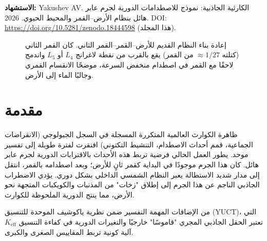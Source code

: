 \documentclass[11pt,a4paper]{article}
\begin{document}
	\vspace{0.1cm}
	\noindent
	{\color{darkblue}\textbf{الاستشهاد:}} Yakushev AV. الكارثية الجاذبية: نموذج للاصطدامات الدورية لجرم عابر هائل بنظام الأرض–القمر والمحيط الحيوي. 2026. DOI: \url{https://doi.org/10.5281/zenodo.18444598} (هذا المجلد).
	
	\vspace{0.4cm}
	
	\begin{figure}[htbp]
		\centering
		\caption{إعادة بناء النظام القديم للأرض–القمر–القمر الثاني. كان القمر الثاني (كتلته \(\approx 1/27\) من القمر) يقع بالقرب من نقطة لاغرانج \(L_4\) أو \(L_5\) واندمج لاحقًا مع القمر في اصطدام منخفض السرعة، موضحًا الانقسام القمري وجالبًا الماء إلى الأرض.}
		\label{fig:two-moons}
	\end{figure}
	
	\section{مقدمة}
	
	ظاهرة الكوارث العالمية المتكررة المسجلة في السجل الجيولوجي (الانقراضات الجماعية، قمم أحداث الاصطدام، التنشيط التكتوني) افتقرت لفترة طويلة إلى تفسير موحد. يطور العمل الحالي فرضية تربط هذه الأحداث بالاقترابات الدورية لجرم عابر هائل. كان هذا الجرم موجودًا في البداية كقمر ثانٍ للأرض؛ وبعد اصطدامه بالقمر، انتقل إلى مدار شديد الاستطالة يعبر النظام الشمسي الداخلي بشكل دوري. يؤدي الاضطراب الجاذبي الناجم عن هذا الجرم إلى إطلاق "زخات" من المذنبات والكويكبات المتجهة نحو الأرض، مما ينتج الدورية الملحوظة للكوارث.
	
	من الإضافات المهمة التفسير ضمن نظرية ياكوشيف الموحدة للتنسيق (YUCT)، التي تعتبر الحقل الجاذبي المجري "قاموسًا" خارجيًا والتغيرات الدورية في كفاءة التنسيق \(K_{\mathrm{eff}}\) آلية كونية تربط المقاييس الصغرى والكبرى.
	
\end{document}
